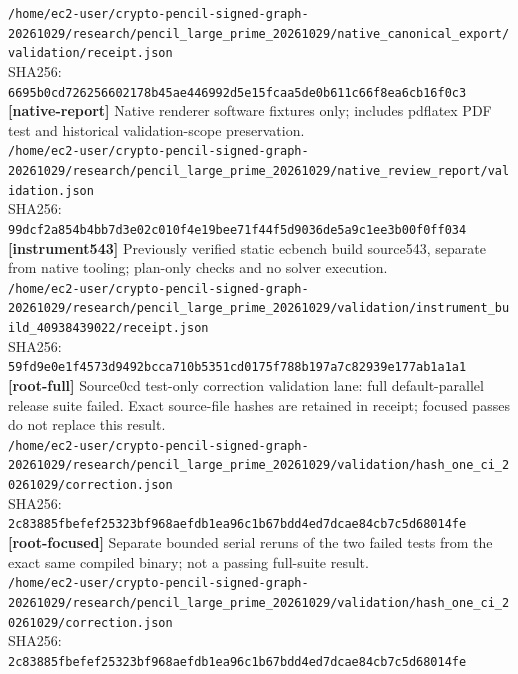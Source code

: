 \documentclass[11pt]{article}
\begin{document}
\texttt{/\allowbreak{}home/\allowbreak{}ec2-user/\allowbreak{}crypto-pencil-signed-graph-20261029/\allowbreak{}research/\allowbreak{}pencil\_large\_prime\_20261029/\allowbreak{}native\_canonical\_export/\allowbreak{}validation/\allowbreak{}receipt.json}\\
SHA256: \texttt{6695b0cd726256602178b45ae446992d5e15fcaa5de0b611c66f8ea6cb16f0c3}\\
\textbf{[native-report]} Native renderer software fixtures only; includes pdflatex PDF test and historical validation-scope preservation.\\
\texttt{/\allowbreak{}home/\allowbreak{}ec2-user/\allowbreak{}crypto-pencil-signed-graph-20261029/\allowbreak{}research/\allowbreak{}pencil\_large\_prime\_20261029/\allowbreak{}native\_review\_report/\allowbreak{}validation.json}\\
SHA256: \texttt{99dcf2a854b4bb7d3e02c010f4e19bee71f44f5d9036de5a9c1ee3b00f0ff034}\\
\textbf{[instrument543]} Previously verified static ecbench build source543, separate from native tooling; plan-only checks and no solver execution.\\
\texttt{/\allowbreak{}home/\allowbreak{}ec2-user/\allowbreak{}crypto-pencil-signed-graph-20261029/\allowbreak{}research/\allowbreak{}pencil\_large\_prime\_20261029/\allowbreak{}validation/\allowbreak{}instrument\_build\_40938439022/\allowbreak{}receipt.json}\\
SHA256: \texttt{59fd9e0e1f4573d9492bcca710b5351cd0175f788b197a7c82939e177ab1a1a1}\\
\textbf{[root-full]} Source0cd test-only correction validation lane: full default-parallel release suite failed. Exact source-file hashes are retained in receipt; focused passes do not replace this result.\\
\texttt{/\allowbreak{}home/\allowbreak{}ec2-user/\allowbreak{}crypto-pencil-signed-graph-20261029/\allowbreak{}research/\allowbreak{}pencil\_large\_prime\_20261029/\allowbreak{}validation/\allowbreak{}hash\_one\_ci\_20261029/\allowbreak{}correction.json}\\
SHA256: \texttt{2c83885fbefef25323bf968aefdb1ea96c1b67bdd4ed7dcae84cb7c5d68014fe}\\
\textbf{[root-focused]} Separate bounded serial reruns of the two failed tests from the exact same compiled binary; not a passing full-suite result.\\
\texttt{/\allowbreak{}home/\allowbreak{}ec2-user/\allowbreak{}crypto-pencil-signed-graph-20261029/\allowbreak{}research/\allowbreak{}pencil\_large\_prime\_20261029/\allowbreak{}validation/\allowbreak{}hash\_one\_ci\_20261029/\allowbreak{}correction.json}\\
SHA256: \texttt{2c83885fbefef25323bf968aefdb1ea96c1b67bdd4ed7dcae84cb7c5d68014fe}\\
\end{document}
